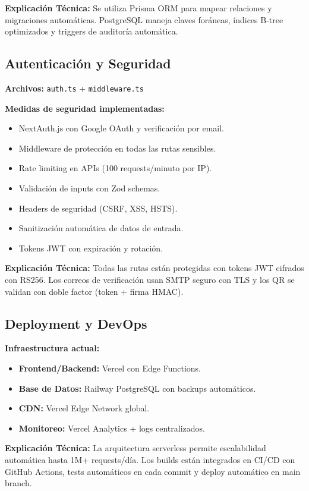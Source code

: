 \documentclass[a4paper,12pt]{article}
\begin{document}
\textbf{Explicación Técnica:}  
Se utiliza Prisma ORM para mapear relaciones y migraciones automáticas. PostgreSQL maneja claves foráneas, índices B-tree optimizados y triggers de auditoría automática.

\subsection{Autenticación y Seguridad}
\textbf{Archivos:} \texttt{auth.ts} + \texttt{middleware.ts}

\textbf{Medidas de seguridad implementadas:}
\begin{itemize}
  \item NextAuth.js con Google OAuth y verificación por email.
  \item Middleware de protección en todas las rutas sensibles.
  \item Rate limiting en APIs (100 requests/minuto por IP).
  \item Validación de inputs con Zod schemas.
  \item Headers de seguridad (CSRF, XSS, HSTS).
  \item Sanitización automática de datos de entrada.
  \item Tokens JWT con expiración y rotación.
\end{itemize}

\textbf{Explicación Técnica:}  
Todas las rutas están protegidas con tokens JWT cifrados con RS256. Los correos de verificación usan SMTP seguro con TLS y los QR se validan con doble factor (token + firma HMAC).

\subsection{Deployment y DevOps}
\textbf{Infraestructura actual:}
\begin{itemize}
  \item \textbf{Frontend/Backend:} Vercel con Edge Functions.
  \item \textbf{Base de Datos:} Railway PostgreSQL con backups automáticos.
  \item \textbf{CDN:} Vercel Edge Network global.
  \item \textbf{Monitoreo:} Vercel Analytics + logs centralizados.
\end{itemize}

\textbf{Explicación Técnica:}  
La arquitectura serverless permite escalabilidad automática hasta 1M+ requests/día. Los builds están integrados en CI/CD con GitHub Actions, tests automáticos en cada commit y deploy automático en main branch.
\end{document}
